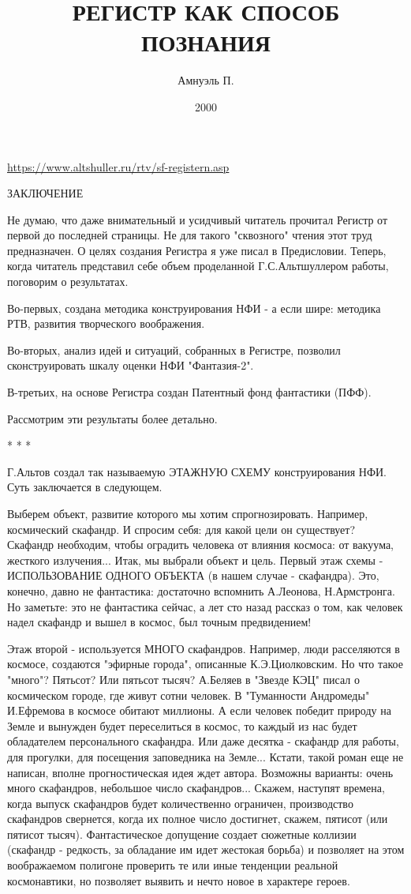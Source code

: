 \documentclass[11pt,a4paper]{article}
\title{РЕГИСТР КАК СПОСОБ ПОЗНАНИЯ}
\author{Амнуэль П.}
\date{2000}
\begin{document}
\maketitle


\url{https://www.altshuller.ru/rtv/sf-registern.asp}

ЗАКЛЮЧЕНИЕ

Не думаю, что даже внимательный и усидчивый читатель прочитал Регистр от
первой до последней страницы. Не для такого "сквозного" чтения этот труд
предназначен. О целях создания Регистра я уже писал в Предисловии. Теперь,
когда читатель представил себе объем проделанной Г.С.Альтшуллером работы,
поговорим о результатах.

Во-первых, создана методика конструирования НФИ - а если шире: методика РТВ,
развития творческого воображения.

Во-вторых, анализ идей и ситуаций, собранных в Регистре, позволил
сконструировать шкалу оценки НФИ "Фантазия-2".

В-третьих, на основе Регистра создан Патентный фонд фантастики (ПФФ).

Рассмотрим эти результаты более детально.

* * *

Г.Альтов создал так называемую ЭТАЖНУЮ СХЕМУ конструирования НФИ. Суть заключается в следующем.

Выберем объект, развитие которого мы хотим спрогнозировать. Например, космический скафандр. И спросим себя: для какой цели он существует? Скафандр необходим, чтобы оградить человека от влияния космоса: от вакуума, жесткого излучения... Итак, мы выбрали объект и цель. Первый этаж схемы - ИСПОЛЬЗОВАНИЕ ОДНОГО ОБЪЕКТА (в нашем случае - скафандра). Это, конечно, давно не фантастика: достаточно вспомнить А.Леонова, Н.Армстронга. Но заметьте: это не фантастика сейчас, а лет сто назад рассказ о том, как человек надел скафандр и вышел в космос, был точным предвидением!

Этаж второй - используется МНОГО скафандров. Например, люди расселяются в космосе, создаются "эфирные города", описанные К.Э.Циолковским. Но что такое "много"? Пятьсот? Или пятьсот тысяч? А.Беляев в "Звезде КЭЦ" писал о космическом городе, где живут сотни человек. В "Туманности Андромеды" И.Ефремова в космосе обитают миллионы. А если человек победит природу на Земле и вынужден будет переселиться в космос, то каждый из нас будет обладателем персонального скафандра. Или даже десятка - скафандр для работы, для прогулки, для посещения заповедника на Земле... Кстати, такой роман еще не написан, вполне прогностическая идея ждет автора. Возможны варианты: очень много скафандров, небольшое число скафандров... Скажем, наступят времена, когда выпуск скафандров будет количественно ограничен, производство скафандров свернется, когда их полное число достигнет, скажем, пятисот (или пятисот тысяч). Фантастическое допущение создает сюжетные коллизии (скафандр - редкость, за обладание им идет жестокая борьба) и позволяет на этом воображаемом полигоне проверить те или иные тенденции реальной космонавтики, но позволяет выявить и нечто новое в характере героев.
\end{document}
